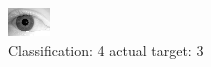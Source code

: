 \begin{figure}[h!]
\begin{center}
\includegraphics[width=0.60\columnwidth]{figures/ID2139_class_4_target_3.png}
\end{center}
\caption{ Classification: 4 actual target: 3}
\label{fig:ID2139_class_4_target_3}
\end{figure}
